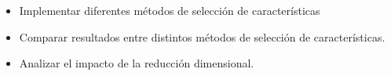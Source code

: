 \begin{itemize}
    \item Implementar diferentes métodos de selección de características
    \item Comparar resultados entre distintos métodos de selección de
          características.
    \item Analizar el impacto de la reducción dimensional.
\end{itemize}